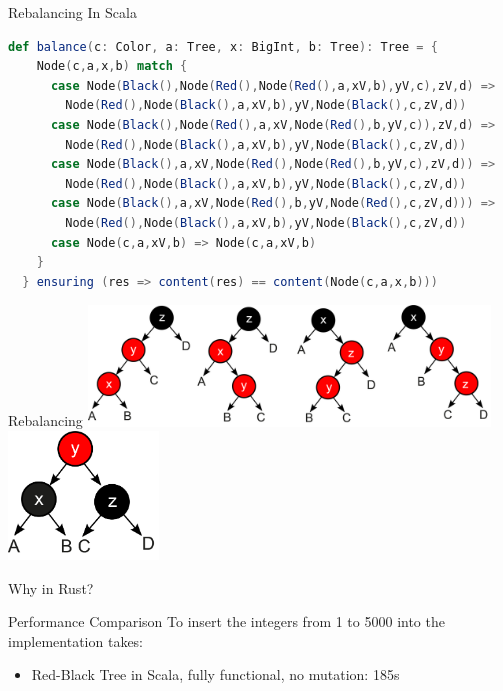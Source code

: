 \begin{frame}[fragile]{Rebalancing}
In Scala
\begin{lstlisting}[language=Scala, basicstyle=\footnotesize\ttfamily,]
def balance(c: Color, a: Tree, x: BigInt, b: Tree): Tree = {
    Node(c,a,x,b) match {
      case Node(Black(),Node(Red(),Node(Red(),a,xV,b),yV,c),zV,d) =>
        Node(Red(),Node(Black(),a,xV,b),yV,Node(Black(),c,zV,d))
      case Node(Black(),Node(Red(),a,xV,Node(Red(),b,yV,c)),zV,d) =>
        Node(Red(),Node(Black(),a,xV,b),yV,Node(Black(),c,zV,d))
      case Node(Black(),a,xV,Node(Red(),Node(Red(),b,yV,c),zV,d)) =>
        Node(Red(),Node(Black(),a,xV,b),yV,Node(Black(),c,zV,d))
      case Node(Black(),a,xV,Node(Red(),b,yV,Node(Red(),c,zV,d))) =>
        Node(Red(),Node(Black(),a,xV,b),yV,Node(Black(),c,zV,d))
      case Node(c,a,xV,b) => Node(c,a,xV,b)
    }
  } ensuring (res => content(res) == content(Node(c,a,x,b)))
\end{lstlisting}
\end{frame}

\begin{frame}{Rebalancing}
  \centering
  \includegraphics[width=0.8\textwidth]{img/rbtree_cases.png}
  \vfill
  \includegraphics[width=0.3\textwidth]{img/rbtree_solution.png}
\end{frame}

\begin{frame}[standout]
  Why in Rust?
\end{frame}

\begin{frame}{Performance Comparison}
To insert the integers from 1 to 5000 into the implementation takes:
\begin{itemize}
  \item Red-Black Tree in Scala, fully functional, no mutation: 185s
\end{itemize}
\end{frame}

